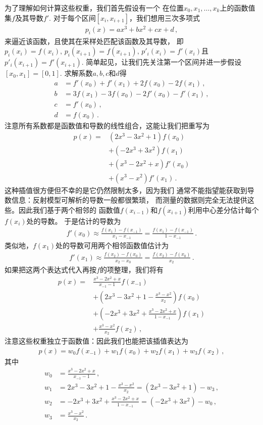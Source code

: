 为了理解如何计算这些权重，我们首先假设有一个
在位置$x_0,x_1,\dots,x_k$上的函数值集$f$及其导数$f'$.
对于每个区间$[x_i,x_{i+1}]$，我们想用三次多项式
\begin{align}\label{eq:8.25}
    p_i(x)=ax^3+bx^2+cx+d\, ,
\end{align}
来逼近该函数，且使其在采样处匹配该函数及其导数，
即$p_i(x_i)=f(x_i),\,p_i(x_{i+1})=f(x_{i+1}),\,p'_i(x_i)=f'(x_i)$且$p'_i(x_{i+1})=f'(x_{i+1})$.
简单起见，让我们先关注第一个区间并进一步假设$[x_0,x_1]=[0,1]$.
求解系数$a,b,c$和$d$得
\begin{align*}
    a&=f'(x_0)+f'(x_1)+2f(x_0)-2f(x_1)\, ,\\
    b&=3f(x_1)-3f(x_0)-2f'(x_0)-f'(x_1)\, ,\\
    c&=f'(x_0)\, ,\\
    d&=f(x_0)\, .
\end{align*}
注意所有系数都是函数值和导数的线性组合，这能让我们把重写为
\begin{align}\label{eq:8.26}
    p(x)=&(2x^3-3x^2+1)f(x_0)\nonumber\\
    &+(-2x^3+3x^2)f(x_1)\nonumber\\
    &+(x^3-2x^2+x)f'(x_0)\nonumber\\
    &+(x^3-x^2)f'(x_1)\, .
\end{align}
这种插值很方便但不幸的是它仍然限制太多，因为我们
通常不能指望能获取到导数信息：反射模型可解析的导数一般都很繁琐，
而测量的数据则完全无法提供这些。因此我们基于两个相邻的
函数值$f(x_{i-1})$和$f(x_{i+1})$利用中心差分估计每个$f(x_i)$处的导数。
于是估计的导数为
\begin{align*}
    f'(x_0)\approx\frac{f(x_1)-f(x_{-1})}{x_1-x_{-1}}=\frac{f(x_1)-f(x_{-1})}{1-x_{-1}}\, .
\end{align*}
类似地，$f(x_1)$处的导数可用两个相邻函数值估计为
\begin{align*}
    f'(x_1)\approx\frac{f(x_2)-f(x_0)}{x_2-x_0}=\frac{f(x_2)-f(x_0)}{x_2}\, .
\end{align*}
如果把这两个表达式代入再按$f$的项整理，我们将有
\begin{align*}
    p(x)=&\frac{x^3-2x^2+x}{x_{-1}-1}f(x_{-1})\\
    &+\left(2x^3-3x^2+1-\frac{x^3-x^2}{x_2}\right)f(x_0)\\
    &+\left(-2x^3+3x^2+\frac{x^3-2x^2+x}{1-x_{-1}}\right)f(x_1)\\
    &+\frac{x^3-x^2}{x_2}f(x_2)\, ,
\end{align*}
注意这些权重独立于函数值：因此我们也能把该插值表达为
\begin{align}\label{eq:8.27}
    p(x)=w_0f(x_{-1})+w_1f(x_0)+w_2f(x_1)+w_3f(x_2)\, ,
\end{align}
其中
\begin{align}\label{eq:8.28}
    w_0&=\frac{x^3-2x^2+x}{x_{-1}-1}\, ,\nonumber\\
    w_1&=2x^3-3x^2+1-\frac{x^3-x^2}{x_2}=(2x^3-3x^2+1)-w_3\, ,\nonumber\\
    w_2&=-2x^3+3x^2+\frac{x^3-2x^2+x}{1-x_{-1}}=(-2x^3+3x^2)-w_0\, ,\nonumber\\
    w_3&=\frac{x^3-x^2}{x_2}\, .
\end{align}

